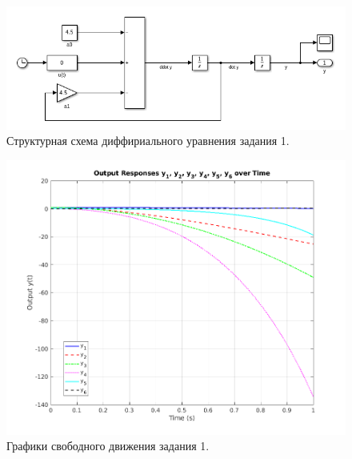 \begin{figure}
    \centering
    \includegraphics[width=1\textwidth]{figs/task_1_slx.png}
    \caption{Структурная схема диффириального уравнения задания 1.}
    \label{fig:task_1_slx}
\end{figure}
    
\begin{figure}
    \centering
    \includegraphics[width=1\textwidth]{figs/task_1_out.png}
    \caption{Графики свободного движения задания 1.}
    \label{fig:task_1_out}
\end{figure}
    